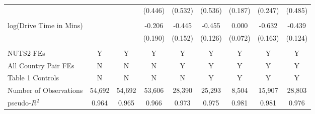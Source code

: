 {\begin{tabular}{l*{8}{c}}
            &                     &                     &     (0.446)         &     (0.532)         &     (0.536)         &     (0.187)         &     (0.247)         &     (0.485)         \\
            &                     &                     &                     &                     &                     &                     &                     &                     \\
log(Drive Time in Mins)&                     &                     &      -0.206         &      -0.445\sym{***}&      -0.455\sym{***}&       0.000         &      -0.632\sym{***}&      -0.439\sym{***}\\
            &                     &                     &     (0.190)         &     (0.152)         &     (0.126)         &     (0.072)         &     (0.163)         &     (0.124)         \\
            &                     &                     &                     &                     &                     &                     &                     &                     \\
\hline
NUTS2 FEs   &           Y         &           Y         &           Y         &           Y         &           Y         &           Y         &           Y         &           Y         \\
All Country Pair FEs&           N         &           N         &           N         &           Y         &           Y         &           Y         &           Y         &           Y         \\
Table 1 Controls&           N         &           N         &           N         &           N         &           Y         &           Y         &           Y         &           Y         \\
Number of Observations&      54,692         &      54,692         &      53,606         &      28,390         &      25,293         &       8,504         &      15,907         &      28,803         \\
pseudo-$R^2$&       0.964         &       0.965         &       0.966         &       0.973         &       0.975         &       0.981         &       0.981         &       0.976         \\
\hline\hline
\end{tabular}
}
